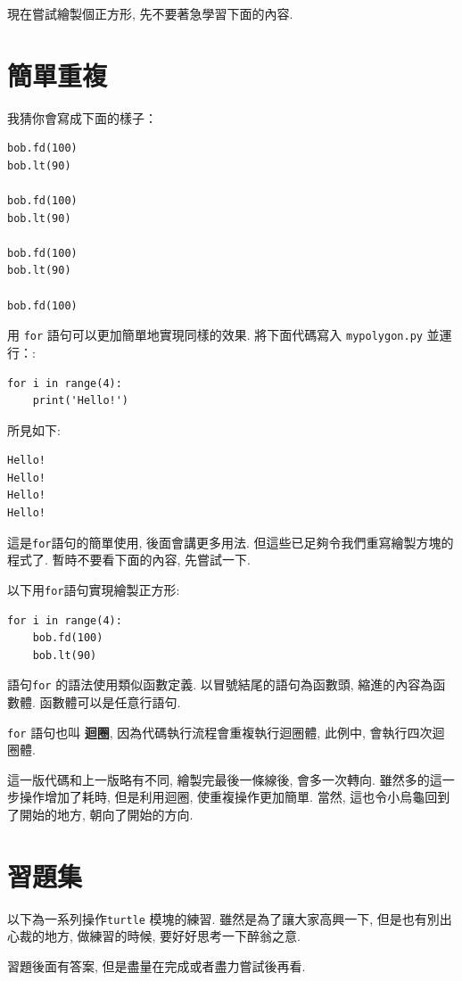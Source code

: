 \documentclass[10pt]{book}
\begin{document}
現在嘗試繪製個正方形, 先不要著急學習下面的內容. 


\section{簡單重複}
\label{repetition}

我猜你會寫成下面的樣子：

\begin{verbatim}
bob.fd(100)
bob.lt(90)

bob.fd(100)
bob.lt(90)

bob.fd(100)
bob.lt(90)

bob.fd(100)
\end{verbatim}
%
用 {\tt for} 語句可以更加簡單地實現同樣的效果. 
將下面代碼寫入 {\tt mypolygon.py} 並運行：:

\begin{verbatim}
for i in range(4):
    print('Hello!')
\end{verbatim}
%
所見如下:

\begin{verbatim}
Hello!
Hello!
Hello!
Hello!
\end{verbatim}
%
這是{\tt for}語句的簡單使用, 後面會講更多用法. 
但這些已足夠令我們重寫繪製方塊的程式了. 
暫時不要看下面的內容, 先嘗試一下. 

以下用{\tt for}語句實現繪製正方形:

\begin{verbatim}
for i in range(4):
    bob.fd(100)
    bob.lt(90)
\end{verbatim}
%
語句{\tt for} 的語法使用類似函數定義. 
以冒號結尾的語句為函數頭, 
縮進的內容為函數體. 
函數體可以是任意行語句. 

 {\tt for} 語句也叫 {\bf 迴圈}, 因為代碼執行流程會重複執行迴圈體, 
此例中, 會執行四次迴圈體.

這一版代碼和上一版略有不同, 繪製完最後一條線後, 會多一次轉向. 
雖然多的這一步操作增加了耗時, 但是利用迴圈, 使重複操作更加簡單. 
當然, 這也令小烏龜回到了開始的地方, 朝向了開始的方向. 

\section{習題集}
以下為一系列操作{\tt turtle} 模塊的練習. 
雖然是為了讓大家高興一下, 但是也有別出心裁的地方, 
做練習的時候, 要好好思考一下醉翁之意. 

習題後面有答案, 但是盡量在完成或者盡力嘗試後再看. 
\end{document}
